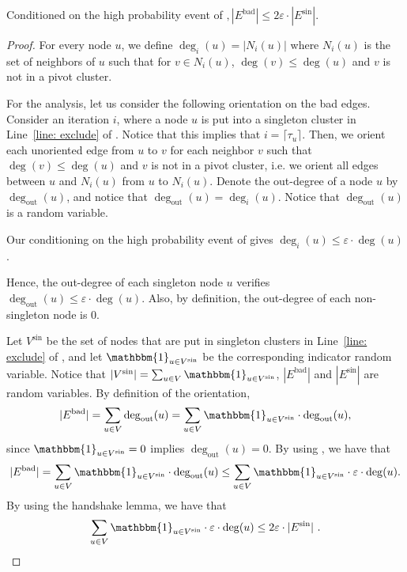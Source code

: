 \documentclass{theoretics}
\newcommand{\eps}{\ensuremath{\varepsilon}}
\newcommand{\badedges}{\ensuremath{E^{\textrm{bad}}}\xspace}
\newcommand{\singletonedges}{\ensuremath{E^{\textrm{sin}}}\xspace}
\newcommand{\outdeg}{\ensuremath{\deg_{\textrm{out}}}\xspace}
\newcommand{\vsin}{V^\textrm{sin}\xspace}
\begin{document}
 \begin{lemma}\label{lemma: goodedges}
     Conditioned on the high probability event of $, |\badedges| \le 2\eps \cdot |\singletonedges|$.
 \end{lemma}
 \begin{proof}
        For every node $u$, we define $\deg_i(u) = |N_i(u)|$ where $N_i(u)$ is the set of neighbors of $u$ such that for $v \in N_i(u)$, $\deg(v) \leq \deg(u)$ and $v$ is not in a pivot cluster.
 
         For the analysis, let us consider the following orientation on the bad edges.
         Consider an iteration $i$, where a node $u$ is put into a singleton cluster in Line~\ref{line: exclude} of .
         Notice that this implies that $i = \lceil\tau_u\rceil$.
         Then, we orient each unoriented edge from $u$ to $v$ for each neighbor $v$ such that $\deg(v) \leq \deg(u)$ and $v$ is not in a pivot cluster, i.e. we orient all edges between $u$ and $N_i(u)$ from $u$ to $N_i(u)$. 
         Denote the out-degree of a node $u$ by $\outdeg(u)$, and notice that $\outdeg(u) = \deg_i(u)$. 
         Notice that $\outdeg(u)$ is a random variable. 
         
         Our conditioning on the high probability event of  gives $\deg_{i}(u) \le \eps \cdot \deg(u)$. 
        
        Hence, the out-degree of each singleton node $u$ verifies $\outdeg(u) \le \eps \cdot \deg(u)$. 
        Also, by definition, the out-degree of each non-singleton node is $0$. 
         
                
        Let $\vsin$ be the set of nodes that are put in singleton clusters in Line~\ref{line: exclude} of , and let $\mathbbm{1}_{u\in \vsin}$ be the corresponding indicator random variable. 
        Notice that $|\vsin| = \sum_{u\in V}\mathbbm{1}_{u\in \vsin}$, $|\badedges|$ and $|\singletonedges|$ are random variables. 
        By definition of the orientation,
        \[
            |\badedges| = \sum_{u\in V} \outdeg(u) = \sum_{u\in V} \mathbbm{1}_{u\in \vsin}\cdot \outdeg(u),  
        \]
        since $\mathbbm{1}_{u\in \vsin} = 0$ implies $\outdeg(u) = 0$. 
        By using , we have that 
     \[
         |\badedges| = \sum_{u\in V}\mathbbm{1}_{u\in \vsin} \cdot \outdeg(u) \leq \sum_{u\in V} \mathbbm{1}_{u\in \vsin}\cdot \eps \cdot \deg(u) .
     \]       
     By using the handshake lemma, we have that
     \[
        \sum_{u\in V} \mathbbm{1}_{u\in \vsin}\cdot \eps \cdot \deg(u) \leq 2\eps \cdot |\singletonedges| \ . \qedhere
     \]
        
 \end{proof}
\end{document}
